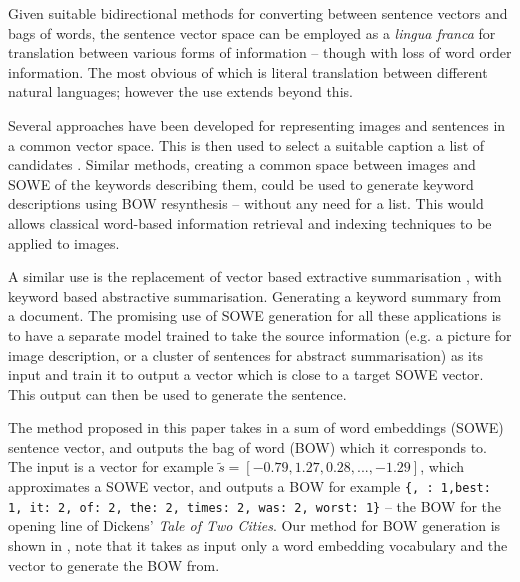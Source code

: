 \documentclass{llncs}
\begin{document}
Given suitable bidirectional methods for converting between sentence vectors and bags of words, the sentence vector space can be employed as a \emph{lingua franca} for translation between various forms of information -- though with loss of word order information. The most obvious of which is literal translation between different natural languages; however the use extends beyond this.

Several approaches have been developed for representing images and sentences in a common vector space. This is then used to select a suitable caption a list of candidates \parencite{farhadi2010every,socherDTRNN}. Similar methods, creating a common space between images and SOWE of the keywords describing them, could be used to generate keyword descriptions using BOW resynthesis -- without any need for a list. This would allows classical word-based information retrieval and indexing techniques to be applied to images.

A similar use is the replacement of vector based extractive summarisation \textcite{KaagebExtractiveSummaristation,yogatamaextractive}, with keyword based abstractive summarisation. Generating a keyword summary from a document. The promising use of SOWE generation for all these applications is to have a separate model trained to take the source information (e.g. a picture for image description, or a cluster of sentences for abstract summarisation) as its input and train it to output a vector which is close to a target SOWE vector. This output can then be used to generate the sentence.

\begin{comment}
There are currently three existing methods for sentence regeneration -- each tied to different machine learnt embedding representation. 
The current state of the art for full sentence generation are the works of \cite{iyyer2014generating} and \cite{Bowman2015SmoothGeneration}. 
Beyond the original work in the area of \cite{Dinu2014CompositionalGeneration} which is only theorised to extend beyond short phrases, both produce full sentences. These sentences are qualitatively shown to be loosely similar in meaning to the original sentences. Neither works has produced quantitative evaluation, making it hard to determine between them. Both are detailed further in the next section.
\end{comment}

The method proposed in this paper takes in a sum of word embeddings (SOWE) sentence vector, and outputs the bag of word (BOW) which it corresponds to. The input is a vector for example $\tilde{s}=[-0.79, 1.27,0.28,...,-1.29]$, which approximates a SOWE vector, and outputs a BOW for example \texttt{\{, : 1,best: 1, it: 2, of: 2, the: 2, times: 2, was: 2, worst: 1\}} -- the BOW for the opening line of Dickens' \emph{Tale of Two Cities}. Our method for BOW generation is shown in , note that it takes as input only a word embedding vocabulary and the vector to generate the BOW from. 
\end{document}
